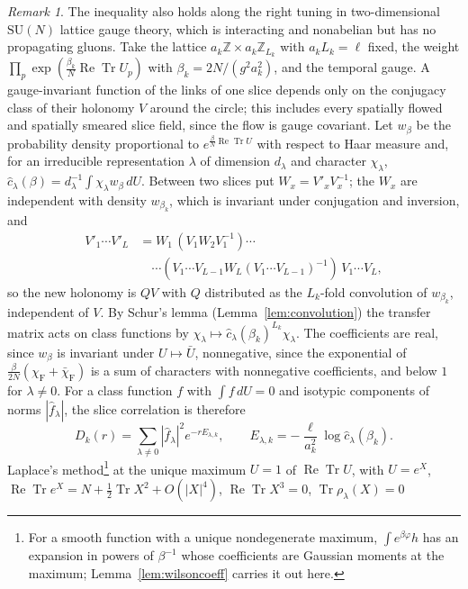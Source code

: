 \documentclass[11pt]{amsart}
\theoremstyle{definition}
\theoremstyle{remark}
\newtheorem{remark}[theorem]{Remark}
\numberwithin{equation}{section}
\newcommand{\Z}{\mathbb{Z}}
\newcommand{\SU}{\mathrm{SU}}
\newcommand{\ReTr}{\operatorname{Re}\operatorname{Tr}}
\begin{document}
\begin{remark}\label{rem:twodslice}
The inequality also holds along the right tuning in two-dimensional $\SU(N)$
lattice gauge theory, which is interacting and nonabelian but has no
propagating gluons. Take the lattice $a_k\Z\times a_k\Z_{L_k}$ with
$a_kL_k=\ell$ fixed, the weight $\prod_p\exp(\frac{\beta_k}N\ReTr U_p)$ with
$\beta_k=2N/(g^2a_k^2)$, and the temporal gauge. A gauge-invariant function
of the links of one slice depends only on the conjugacy class of their
holonomy $V$ around the circle; this includes every spatially flowed and
spatially smeared slice field, since the flow is gauge covariant. Let
$w_\beta$ be the probability density proportional to
$e^{\frac\beta N\ReTr U}$ with respect to Haar measure and, for an irreducible
representation $\lambda$ of dimension $d_\lambda$ and character
$\chi_\lambda$, $\hat c_\lambda(\beta)=d_\lambda^{-1}\int\chi_\lambda
w_\beta\,dU$. Between two slices put $W_x=V'_xV_x^{-1}$; the $W_x$ are
independent with density $w_{\beta_k}$, which is invariant under conjugation
and inversion, and
\[
\begin{split}
V'_1\cdots V'_{L}&=W_1\,(V_1W_2V_1^{-1})\cdots\\
&\quad\cdots(V_1\cdots V_{L-1}W_{L}(V_1\cdots V_{L-1})^{-1})\,V_1\cdots V_{L},
\end{split}
\]
so the new holonomy is $QV$ with $Q$ distributed as the $L_k$-fold
convolution of $w_{\beta_k}$, independent of $V$. By Schur's lemma (Lemma~\ref{lem:convolution}) the
transfer matrix acts on class functions by $\chi_\lambda\mapsto\hat
c_\lambda(\beta_k)^{L_k}\chi_\lambda$. The coefficients are real, since
$w_\beta$ is invariant under $U\mapsto\bar U$, nonnegative, since the
exponential of $\frac\beta{2N}(\chi_{\mathrm F}+\bar\chi_{\mathrm F})$ is a sum of
characters with nonnegative coefficients, and below $1$ for
$\lambda\ne0$. For a class function $f$ with $\int f\,dU=0$ and isotypic
components of norms $|\hat f_\lambda|$, the slice correlation is therefore
\[
D_k(r)=\sum_{\lambda\ne0}|\hat f_\lambda|^2e^{-rE_{\lambda,k}},\qquad
E_{\lambda,k}=-\frac{\ell}{a_k^2}\log\hat c_\lambda(\beta_k).
\]
Laplace's method\footnote{For a smooth function with a unique nondegenerate maximum, $\int e^{\beta\varphi}h$ has an expansion in powers of $\beta^{-1}$ whose coefficients are Gaussian moments at the maximum; Lemma~\ref{lem:wilsoncoeff} carries it out here.} at the unique maximum $U=1$ of $\ReTr U$, with
$U=e^X$, $\ReTr e^X=N+\frac12\operatorname{Tr}X^2+O(|X|^4)$,
$\operatorname{Re}\operatorname{Tr}X^3=0$, $\operatorname{Tr}\rho_\lambda(X)=0$

\end{remark}
\end{document}
